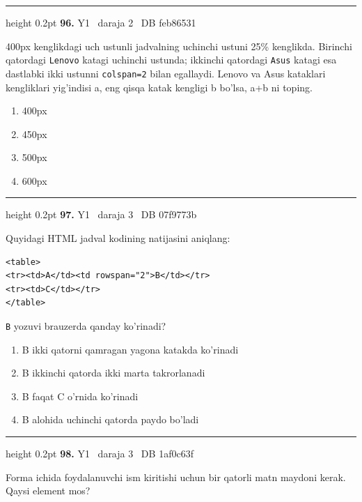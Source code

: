 \documentclass[10pt,a4paper,oneside]{article}
\begin{document}
\vspace{2mm}\hrule height 0.2pt \vspace{4mm}
\hypertarget{q96}{\textbf{\color{ink}96.}}  {\color{muted}\scriptsize Y1 \textbullet\ daraja 2 \textbullet\ DB feb86531}
\par
400px kenglikdagi uch ustunli jadvalning uchinchi ustuni 25\% kenglikda. Birinchi qatordagi \texttt{Lenovo} katagi uchinchi ustunda; ikkinchi qatordagi \texttt{Asus} katagi esa dastlabki ikki ustunni \texttt{colspan=2} bilan egallaydi. Lenovo va Asus kataklari kengliklari yig'indisi a, eng qisqa katak kengligi b bo'lsa, a+b ni toping.
\begin{enumerate}[label=\Alph*),leftmargin=9mm]
\item 400px
\item 450px
\item 500px
\item 600px
\end{enumerate}
\vspace{2mm}\hrule height 0.2pt \vspace{4mm}
\hypertarget{q97}{\textbf{\color{ink}97.}}  {\color{muted}\scriptsize Y1 \textbullet\ daraja 3 \textbullet\ DB 07f9773b}
\par
Quyidagi HTML jadval kodining natijasini aniqlang:\par
\begin{lstlisting}
<table>
<tr><td>A</td><td rowspan="2">B</td></tr>
<tr><td>C</td></tr>
</table>
\end{lstlisting}
\par
\texttt{B} yozuvi brauzerda qanday ko'rinadi?
\begin{enumerate}[label=\Alph*),leftmargin=9mm]
\item B ikki qatorni qamragan yagona katakda ko'rinadi
\item B ikkinchi qatorda ikki marta takrorlanadi
\item B faqat C o'rnida ko'rinadi
\item B alohida uchinchi qatorda paydo bo'ladi
\end{enumerate}
\vspace{2mm}\hrule height 0.2pt \vspace{4mm}
\hypertarget{q98}{\textbf{\color{ink}98.}}  {\color{muted}\scriptsize Y1 \textbullet\ daraja 3 \textbullet\ DB 1af0c63f}
\par
Forma ichida foydalanuvchi ism kiritishi uchun bir qatorli matn maydoni kerak. Qaysi element mos?
\end{document}
